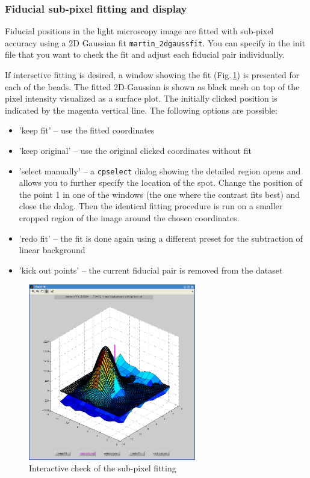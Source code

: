 \documentclass[10pt,a4paper,onepage,DIV12]{scrartcl}
\begin{document}
\subsubsection{Fiducial sub-pixel fitting and display}
\label{sec:gaussfit}
Fiducial positions in the light microscopy image are fitted with sub-pixel accuracy using a  2D Gaussian fit \texttt{martin\_2dgaussfit}.
You can specify in the init file that you want to check the fit and adjust each fiducial pair individually.

If intersctive fitting is desired, a window showing the fit (Fig.\,\ref{fig:gaussfit_gui}) is presented for each of the beads. The fitted 2D-Gaussian is shown as black mesh on top of the pixel intensity visualized as a surface plot. The initially clicked position is indicated by the magenta vertical line. The following options are possible:
\begin{itemize}
 \item 'keep fit' -- use the fitted coordinates
 \item 'keep original' -- use the original clicked coordinates without fit
 \item 'select manually' -- a \texttt{cpselect} dialog showing the detailed region opens and allows you to further specify the location of the spot. Change the position of the point 1 in one of the windows (the one where the contrast fits best) and close the dalog. Then the identical fitting procedure is run on a smaller cropped region of the image around the chosen coordinates.
 \item 'redo fit' -- the fit is done again using a different preset for the subtraction of linear background
 \item 'kick out points' -- the current fiducial pair is removed from the dataset
\end{itemize}

\begin{figure}[h!]
 \centering
 \includegraphics[width=0.65\textwidth]{images/gaussfit_gui.png}
 \caption{Interactive check of the sub-pixel fitting}
 \label{fig:gaussfit_gui}
\end{figure}
\end{document}
